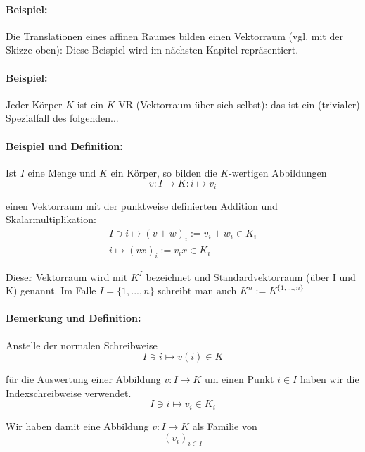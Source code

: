 \paragraph{Beispiel:}
	Die Translationen eines affinen Raumes bilden einen Vektorraum (vgl. mit der Skizze oben): Diese Beispiel wird im nächsten Kapitel repräsentiert.
	
\paragraph{Beispiel:}
	Jeder Körper $ K $ ist ein $ K $-VR (Vektorraum über sich selbst): das ist ein (trivialer) Spezialfall des folgenden...
	
\paragraph{Beispiel und Definition:}
	Ist $ I $ eine Menge und $ K $ ein Körper, so bilden die $ K $-wertigen Abbildungen
	\begin{equation*}
		v: I \to K: i \mapsto v_i
	\end{equation*}

	einen Vektorraum mit der punktweise definierten Addition und Skalarmultiplikation:
	\begin{gather*}
		I\ni i \mapsto (v+w)_i := v_i+w_i\in K_i\\
		i \mapsto (vx)_i := v_ix \in K_i
	\end{gather*}

	Dieser Vektorraum wird mit $K^{I}$ bezeichnet und Standardvektorraum (über I und K) genannt. Im Falle $ I=\{1,...,n\} $ schreibt man auch $K^{n} := K^{\{1,...,n\}}$

\paragraph{Bemerkung und Definition:}
	Anstelle der normalen Schreibweise
	\begin{equation*}
		I\ni i \mapsto v(i) \in K
	\end{equation*}

	für die Auswertung einer Abbildung  $v: I \to K$ um einen Punkt $i\in I$ haben wir die Indexschreibweise verwendet.
	\begin{equation*}
		I\ni i \mapsto v_i \in K_i
	\end{equation*}

	Wir haben damit eine Abbildung $v: I \to K$ als Familie von
	\begin{equation*}
		(v_i)_{i\in I}
	\end{equation*}

